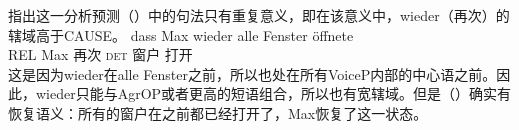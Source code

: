 
\citet{JB2003a-u}指出这一分析预测（）中的句法只有重复意义，即在该意义中，wieder（再次）的辖域高于CAUSE。
\ea
\label{ex-wieder-alle}
\gll dass Max wieder alle Fenster öffnete\\
    REL Max 再次 \textsc{det} 窗户 打开\\
\z
这是因为wieder在alle Fenster之前，所以也处在所有VoiceP内部的中心语之前。因此，wieder只能与AgrOP或者更高的短语组合，所以也有宽辖域。但是（）确实有恢复语义：所有的窗户在之前都已经打开了，Max恢复了这一状态。


